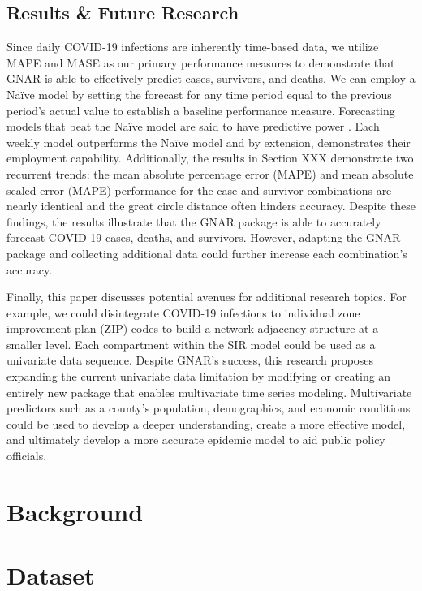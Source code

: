 \subsection{Results \& Future Research}\label{section:results and future research}
Since daily COVID-19 infections are inherently time-based data, we utilize {MAPE} and {MASE} as our primary performance measures to demonstrate that {GNAR} is able to effectively predict cases, survivors, and deaths.  We can employ a Na\"ive model by setting the forecast for any time period equal to the previous period’s actual value to establish a baseline performance measure.  Forecasting models that beat the Na\"ive model are said to have predictive power  \cite{timeseriespredictivepower}.  Each weekly model outperforms the Na\"ive model and by extension, demonstrates their employment capability.  Additionally, the results in Section XXX %
demonstrate two recurrent trends: the mean absolute percentage error (MAPE) and mean absolute scaled error (MAPE) performance for the case and survivor combinations are nearly identical and the great circle distance often hinders accuracy.  Despite these findings, the results illustrate that the {GNAR} package is able to accurately forecast {COVID-19} cases, deaths, and survivors.  However, adapting the {GNAR} package and collecting additional data could further increase each combination's accuracy.

Finally, this paper discusses potential avenues for additional research topics.  For example, we could disintegrate {COVID-19} infections to individual zone improvement plan (ZIP) codes to build a network adjacency structure at a smaller level.  Each compartment within the {SIR} model could be used as a univariate data sequence.  Despite {GNAR}'s success, this research proposes expanding the current univariate data limitation by modifying or creating an entirely new package that enables multivariate time series modeling.  Multivariate predictors such as a county's population, demographics, and economic conditions could be used to develop a deeper understanding, create a more effective model, and ultimately develop a more accurate epidemic model to aid public policy officials.

\section{Background}



\section{Dataset}

